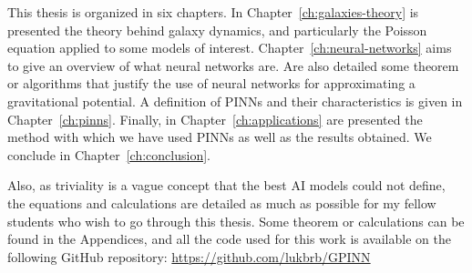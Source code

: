 This thesis is organized in six chapters. In Chapter~\ref{ch:galaxies-theory} is presented the theory behind galaxy dynamics, and particularly the Poisson equation applied to some models of interest. Chapter~\ref{ch:neural-networks} aims to give an overview of what neural networks are. Are also detailed some theorem or algorithms that justify the use of neural networks for approximating a gravitational potential. A definition of PINNs and their characteristics is given in Chapter~\ref{ch:pinns}. Finally, in Chapter~\ref{ch:applications} are presented the method with which we have used PINNs as well as the results obtained. We conclude in Chapter~\ref{ch:conclusion}. 

\par Also, as triviality is a vague concept that the best AI models could not define, the equations and calculations are detailed as much as possible for my fellow students who wish to go through this thesis. Some theorem or calculations can be found in the Appendices, and all the code used for this work is available on the following GitHub repository: \url{https://github.com/lukbrb/GPINN}  
